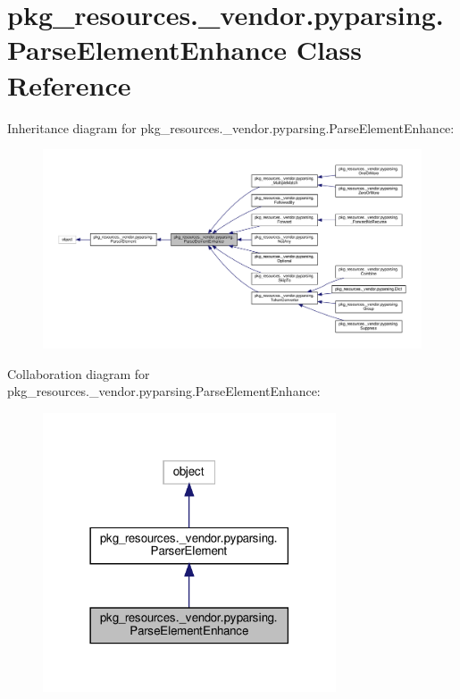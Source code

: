 \hypertarget{classpkg__resources_1_1__vendor_1_1pyparsing_1_1ParseElementEnhance}{}\section{pkg\+\_\+resources.\+\_\+vendor.\+pyparsing.\+Parse\+Element\+Enhance Class Reference}
\label{classpkg__resources_1_1__vendor_1_1pyparsing_1_1ParseElementEnhance}


Inheritance diagram for pkg\+\_\+resources.\+\_\+vendor.\+pyparsing.\+Parse\+Element\+Enhance\+:
\nopagebreak
\begin{figure}[H]
\begin{center}
\leavevmode
\includegraphics[width=350pt]{classpkg__resources_1_1__vendor_1_1pyparsing_1_1ParseElementEnhance__inherit__graph}
\end{center}
\end{figure}


Collaboration diagram for pkg\+\_\+resources.\+\_\+vendor.\+pyparsing.\+Parse\+Element\+Enhance\+:
\nopagebreak
\begin{figure}[H]
\begin{center}
\leavevmode
\includegraphics[width=246pt]{classpkg__resources_1_1__vendor_1_1pyparsing_1_1ParseElementEnhance__coll__graph}
\end{center}
\end{figure}
